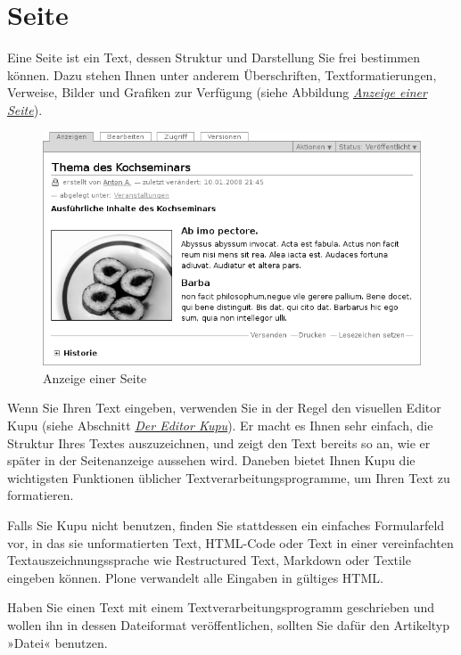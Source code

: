 \documentclass[a4paper,12pt,ngerman]{manual}
\begin{document}
\resetcurrentobjects
\hypertarget{--doc-inhaltstypen/dokument}{}

\hypertarget{sec-dokument}{}\section{Seite}

Eine Seite ist ein Text, dessen Struktur und Darstellung Sie frei bestimmen
können. Dazu stehen Ihnen unter anderem Überschriften, Textformatierungen,
Verweise, Bilder und Grafiken zur Verfügung (siehe
Abbildung \hyperlink{fig-dokument}{\emph{Anzeige einer Seite}}).
\hypertarget{fig-dokument}{}\begin{figure}[htbp]
\centering

\includegraphics{dokument.png}
\caption{Anzeige einer Seite}\end{figure}

Wenn Sie Ihren Text eingeben, verwenden Sie in der Regel den visuellen Editor
Kupu (siehe Abschnitt \hyperlink{sec-kupu}{\emph{Der Editor Kupu}}). Er macht es Ihnen sehr einfach, die
Struktur Ihres Textes auszuzeichnen, und zeigt den Text bereits so an, wie er
später in der Seitenanzeige aussehen wird. Daneben bietet Ihnen Kupu die
wichtigsten Funktionen üblicher Textverarbeitungsprogramme, um Ihren Text zu
formatieren.

Falls Sie Kupu nicht benutzen, finden Sie stattdessen ein
einfaches Formularfeld vor, in das sie unformatierten Text, HTML-Code oder
Text in einer vereinfachten Textauszeichnungssprache wie Restructured Text,
Markdown oder Textile eingeben können. Plone verwandelt alle Eingaben in
gültiges HTML.

Haben Sie einen Text mit einem Textverarbeitungsprogramm geschrieben und
wollen ihn in dessen Dateiformat veröffentlichen, sollten Sie dafür den
Artikeltyp »Datei« benutzen.
\end{document}
